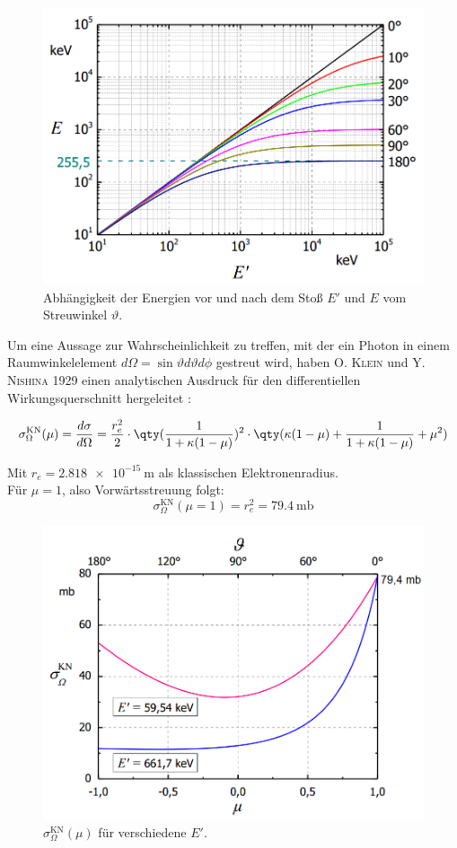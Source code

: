 \documentclass[slug=CS, room=Andreas-Schubert-Bau\,\ Labor\ 406,
supervisor=Juliane\ Volkmer, coursedate=29.\ 11.\ 2019]{../../Lab_Report_LaTeX/lab_report}
\begin{document}
\begin{figure}[H]\centering
        \includegraphics[width=.5\columnwidth]{./pictures/evontheta.png}
        \caption{Abhängigkeit der Energien vor und nach dem Stoß \(E'\) und \(E\) vom Streuwinkel
        \(\vartheta\).}
        \label{fig:evontheta}
\end{figure}

Um eine Aussage zur Wahrscheinlichkeit zu treffen, mit der ein Photon in einem Raumwinkelelement
\(d\Omega = \sin\vartheta d\vartheta d\phi\) gestreut wird, haben \textsc{O. Klein} und
\textsc{Y. Nishina} 1929 einen analytischen Ausdruck für den differentiellen Wirkungsquerschnitt
hergeleitet \cite{kn29}:

\begin{equation}\label{eq:kn}
        \sigma^{\text{KN}}_\Omega(\mu) = \frac{d\sigma}{d\Omega} = \frac{r_e^2}{2} \cdot \qty(\frac{1}{1 + \kappa(1 - \mu)})^2 \cdot \qty(\kappa(1 - \mu) + \frac{1}{1 + \kappa(1 - \mu)} + \mu^2)
\end{equation}

Mit \(r_e = \SI{2,818e-15}{\metre}\) als klassischen Elektronenradius.\\

Für \(\mu = 1\), also Vorwärtsstreuung folgt:
\begin{equation}\label{key}
        \sigma^{\text{KN}}_\Omega(\mu = 1) = r_e^2 = \SI{79,4}{\milli\barn}
\end{equation}

\begin{figure}[H]\centering
        \includegraphics[width=.5\columnwidth]{./pictures/sigma_kn.png}
        \caption{\(\sigma^{\text{KN}}_\Omega(\mu)\) für verschiedene \(E'\).}
        \label{fig:sigmakn}
\end{figure}
\end{document}
